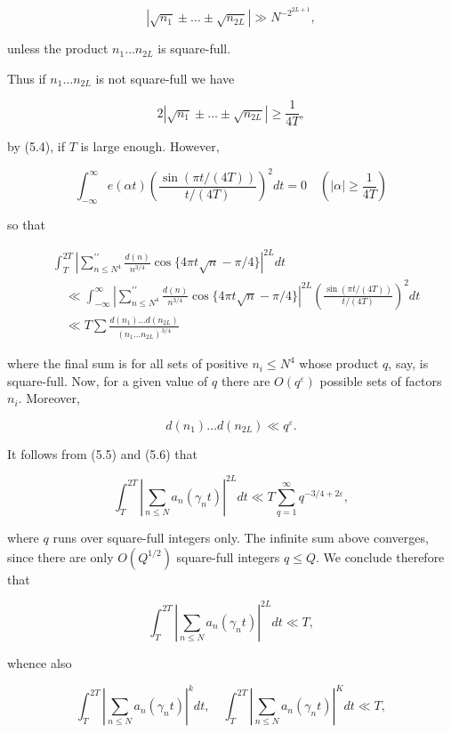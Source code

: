 \documentclass[10pt]{article}
\begin{document}
$$
\left|\sqrt{n_{1}} \pm \ldots \pm \sqrt{n_{2 L}}\right| \gg N^{-2^{2 L+1}},
$$

unless the product $n_{1} \ldots n_{2 L}$ is square-full.

Thus if $n_{1} \ldots n_{2 L}$ is not square-full we have

$$
2\left|\sqrt{n_{1}} \pm \ldots \pm \sqrt{n_{2 L}}\right| \geq \frac{1}{4T},
$$

by (5.4), if $T$ is large enough. However,

$$
\int_{-\infty}^{\infty} e(\alpha t)\left(\frac{\sin\left(\pi t/(4T)\right)}{t/(4T)}\right)^{2} d t=0 \quad\left(|\alpha| \geq \frac{1}{4T}\right)
$$

so that


\begin{align*}
& \int_{T}^{2 T}\left|\sum_{n \leq N^{4}}^{\prime \prime} \frac{d(n)}{n^{3 / 4}} \cos \{4 \pi t \sqrt{n}-\pi / 4\}\right|^{2 L} d t  \tag{5.6}\\
& \quad \ll \int_{-\infty}^{\infty}\left|\sum_{n \leq N^{4}}^{\prime \prime} \frac{d(n)}{n^{3 / 4}} \cos \{4 \pi t \sqrt{n}-\pi / 4\}\right|^{2 L}\left(\frac{\sin\left(\pi t/(4T)\right)}{t/(4T)}\right)^{2} d t \\
& \quad \ll T \sum \frac{d\left(n_{1}\right) \ldots d\left(n_{2 L}\right)}{\left(n_{1} \ldots n_{2 L}\right)^{3 / 4}}
\end{align*}


where the final sum is for all sets of positive $n_{i} \leq N^{4}$ whose product $q$, say, is square-full. Now, for a given value of $q$ there are $O\left(q^{\varepsilon}\right)$ possible sets of factors $n_{i}$. Moreover,

$$
d\left(n_{1}\right) \ldots d\left(n_{2 L}\right) \ll q^{\varepsilon} .
$$

It follows from (5.5) and (5.6) that

$$
\int_{T}^{2 T}\left|\sum_{n \leq N} a_{n}\left(\gamma_{n} t\right)\right|^{2 L} d t \ll T \sum_{q=1}^{\infty} q^{-3 / 4+2 \varepsilon},
$$

where $q$ runs over square-full integers only. The infinite sum above converges, since there are only $O\left(Q^{1 / 2}\right)$ square-full integers $q \leq Q$. We conclude therefore that

$$
\int_{T}^{2 T}\left|\sum_{n \leq N} a_{n}\left(\gamma_{n}t\right)\right|^{2 L} d t \ll T,
$$

whence also


\begin{equation*}
\int_{T}^{2 T}\left|\sum_{n \leq N} a_{n}\left(\gamma_{n}t\right)\right|^{k} d t, \quad \int_{T}^{2 T}\left|\sum_{n \leq N} a_{n}\left(\gamma_{n}t\right)\right|^{K} d t \ll T, \tag{5.7}
\end{equation*}
\end{document}
